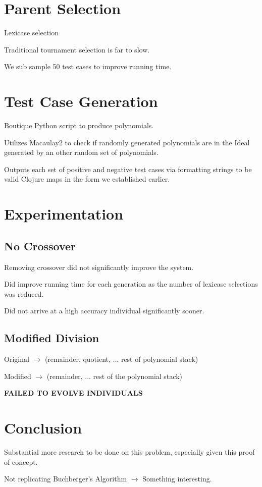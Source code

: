 \documentclass[20pt]{extarticle}
\begin{document}
\newpage
\section*{Parent Selection}

Lexicase selection

Traditional tournament selection is far to slow. 

We sub sample 50 test cases to improve running time.


\newpage
\section*{Test Case Generation}

Boutique Python script to produce polynomials. 

Utilizes Macaulay2 to check if randomly generated polynomials are in the Ideal generated by an other random set of polynomials.

Outputs each set of positive and negative test cases via formatting strings to be valid Clojure maps in the form we established earlier.

\newpage
\section*{Experimentation}
\subsection*{No Crossover}

Removing crossover did not significantly improve the system.

Did improve running time for each generation as the number of lexicase selections was reduced. 

Did not arrive at a high accuracy individual significantly sooner.

\subsection*{Modified Division}

\noindent Original $\rightarrow$ (remainder, quotient, ... rest of polynomial stack)

\noindent Modified $\rightarrow$ (remainder, ... rest of the polynomial stack)

\noindent \textbf{FAILED TO EVOLVE INDIVIDUALS}


\newpage
\section*{Conclusion}

Substantial more research to be done on this problem, especially given this proof of concept.

Not replicating Buchberger's Algorithm $\rightarrow$ Something interesting.
\end{document}
